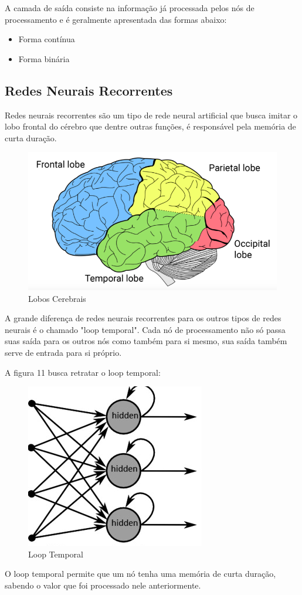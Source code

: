 A camada de saída consiste na informação já processada pelos nós de processamento e é geralmente apresentada
das formas abaixo:

\begin{itemize}
	\item Forma contínua
	\item Forma binária
\end{itemize}

\subsection{Redes Neurais Recorrentes}

Redes neurais recorrentes são um tipo de rede neural artificial que busca imitar o lobo frontal do cérebro que dentre outras funções,
é responsável pela memória de curta duração.

\begin{figure}[h]
	\centering
	\includegraphics[keepaspectratio=true,scale=0.5]{figuras/brainn.png}
	\caption{Lobos Cerebrais \cite{queen}}
	\label{fig10}
\end{figure}

A grande diferença de redes neurais recorrentes para os outros tipos de redes neurais é o chamado "loop temporal". Cada nó de processamento
não só passa suas saída para os outros nós como também para si mesmo, sua saída também serve de entrada para si próprio. \cite{jaeger}

A figura 11 busca retratar o loop temporal:

\begin{figure}[h]
	\centering
	\includegraphics[keepaspectratio=true,scale=0.5]{figuras/rnn.png}
	\caption{Loop Temporal}
	\label{fig11}
\end{figure}

O loop temporal permite que um nó tenha uma memória de curta duração, sabendo o valor que foi processado nele anteriormente.
